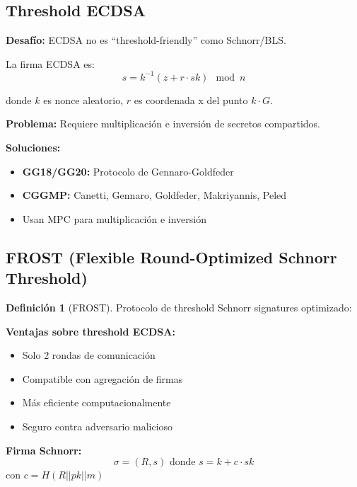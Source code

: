 \documentclass[11pt,a4paper,twoside]{book}
\theoremstyle{definition}
\newtheorem{definition}{Definición}[chapter]
\theoremstyle{remark}
\begin{document}
\subsection{Threshold ECDSA}

\begin{mathnote}
\textbf{Desafío:} ECDSA no es ``threshold-friendly'' como Schnorr/BLS.

La firma ECDSA es:
\[
s = k^{-1}(z + r \cdot sk) \mod n
\]

donde $k$ es nonce aleatorio, $r$ es coordenada x del punto $k \cdot G$.

\textbf{Problema:} Requiere multiplicación e inversión de secretos compartidos.

\textbf{Soluciones:}
\begin{itemize}
    \item \textbf{GG18/GG20:} Protocolo de Gennaro-Goldfeder
    \item \textbf{CGGMP:} Canetti, Gennaro, Goldfeder, Makriyannis, Peled
    \item Usan MPC para multiplicación e inversión
\end{itemize}
\end{mathnote}

\subsection{FROST (Flexible Round-Optimized Schnorr Threshold)}

\begin{definition}[FROST]
Protocolo de threshold Schnorr signatures optimizado:

\textbf{Ventajas sobre threshold ECDSA:}
\begin{itemize}
    \item Solo 2 rondas de comunicación
    \item Compatible con agregación de firmas
    \item Más eficiente computacionalmente
    \item Seguro contra adversario malicioso
\end{itemize}

\textbf{Firma Schnorr:}
\[
\sigma = (R, s) \text{ donde } s = k + c \cdot sk
\]
con $c = H(R || pk || m)$
\end{definition}
\end{document}
